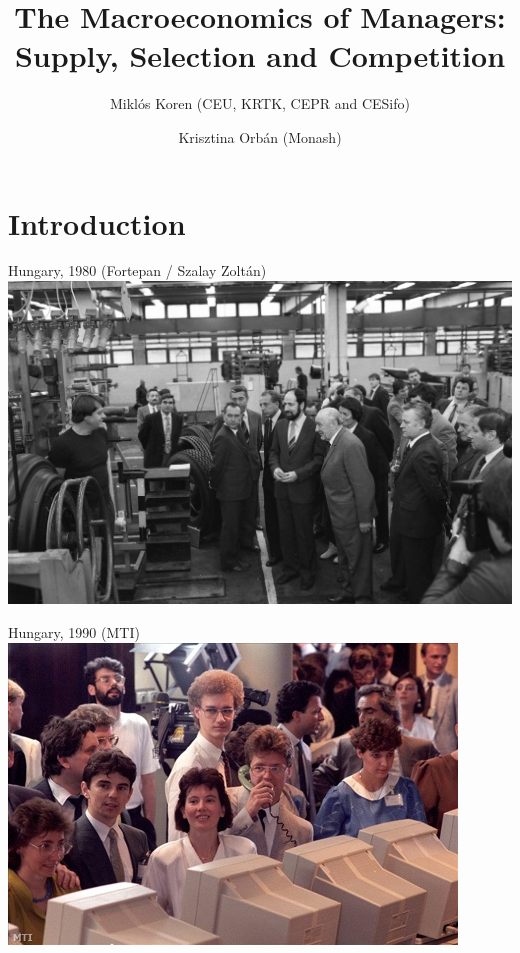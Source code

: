 \documentclass[
  ignorenonframetext,
  aspectratio=1610,
]{beamer}
\title{The Macroeconomics of Managers: Supply, Selection and
Competition}
\author{Miklós Koren (CEU, KRTK, CEPR and CESifo) \and Krisztina Orbán
(Monash)}
\date{December 14, 2023\footnote<.->{Supported by Forefront Research
  Excellence Grant (144193) and ERC Advanced Grant (101097789)}}
\begin{document}
\frame{\titlepage}

\section{Introduction}\label{introduction}

\begin{frame}{Hungary, 1980 (Fortepan / Szalay Zoltán)}
\protect\hypertarget{hungary-1980-fortepan-szalay-zoltuxe1n}{}
\includegraphics{fig/fortepan_198036.jpg}
\end{frame}

\begin{frame}{Hungary, 1990 (MTI)}
\protect\hypertarget{hungary-1990-mti}{}
\includegraphics{fig/tozsde.jpg}
\end{frame}
\end{document}
